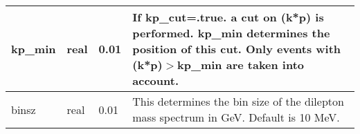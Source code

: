 \documentclass{article}
\begin{document}
\begin{longtable}{llll}
\midrule
kp\_min & \begin{minipage}[t]{2cm}real\end{minipage} & \begin{minipage}[t]{2cm}0.01\end{minipage} & \begin{minipage}[t]{12cm}If kp\_cut=.true. a cut on (k*p) is performed. kp\_min determines the position of this cut. Only events with (k*p)$>$kp\_min are taken into account.\end{minipage}\\*
\midrule
binsz & \begin{minipage}[t]{2cm}real\end{minipage} & \begin{minipage}[t]{2cm}0.01\end{minipage} & \begin{minipage}[t]{12cm}This determines the bin size of the dilepton mass spectrum in GeV. Default is 10 MeV.\end{minipage}\\*
\midrule

\end{longtable}
\end{document}
